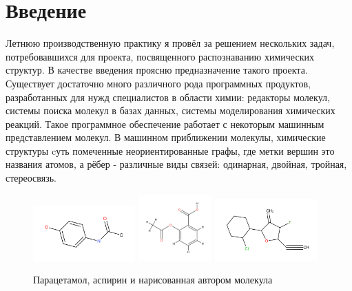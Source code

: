 





\renewcommand{\cftsecleader}{\cftdotfill{\cftsubsecdotsep}}

\onecolumn

\tableofcontents

\onecolumn

\section{Введение}

\noindent
Летнюю производственную практику я провёл за решением нескольких задач, потребовавшихся
для проекта, посвященного распознаванию химических структур. В качестве введения проясню предназначение
такого проекта.\\

\noindent
Существует достаточно много различного рода программных продуктов, разработанных для нужд специалистов в области химии:
редакторы молекул, системы поиска молекул в базах данных, системы моделирования химических реакций. Такое программное 
обеспечение работает с некоторым машинным представлением молекул. В машинном приближении молекулы, химические структуры 
cуть помеченные неориентированные графы, где метки вершин это названия атомов, а рёбер - различные
виды связей: одинарная, двойная, тройная, стереосвязь. \\

\begin{figure}[h]
\centering
{\includegraphics[width=0.35\textwidth]{img/paracetomolum.pdf}}
{\includegraphics[width=0.25\textwidth]{img/aspirine.pdf}}
{\includegraphics[width=0.35\textwidth]{img/1.pdf}}
\caption{Парацетамол, аспирин и нарисованная автором молекула}
\end{figure}

